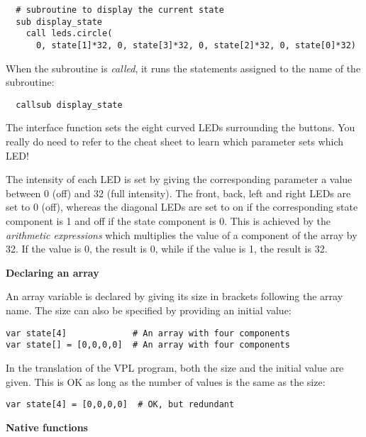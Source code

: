 \begin{footnotesize}
\begin{verbatim}
  # subroutine to display the current state
  sub display_state
    call leds.circle(
      0, state[1]*32, 0, state[3]*32, 0, state[2]*32, 0, state[0]*32)
\end{verbatim}
\end{footnotesize}

When the subroutine is \emph{called}, it runs the statements assigned to
the name of the subroutine:
\vspace{-1ex}
\begin{footnotesize}
\begin{verbatim}
  callsub display_state
\end{verbatim}
\end{footnotesize}
\vspace{-1ex}
The interface function  sets the eight curved LEDs
surrounding the buttons. You really do need to refer to the cheat sheet
to learn which parameter sets which LED!

The intensity of each LED is set by giving the corresponding parameter a
value between 0 (off) and 32 (full intensity). The front, back,
left and right LEDs are set to 0 (off), whereas the diagonal LEDs are
set to on if the corresponding state component is 1 and off if the state
component is 0. This is achieved by the \emph{arithmetic expressions}
 which multiplies the value of a component of the array
by 32. If the value is 0, the result is 0, while if the value is 1, the
result is 32.

\textbf{\large Declaring an array}

An array variable is declared by giving its size in brackets following
the array name. The size can also be specified by providing an initial
value:

\begin{verbatim}
var state[4]             # An array with four components
var state[] = [0,0,0,0]  # An array with four components
\end{verbatim}

In the translation of the VPL program, both the size and the initial
value are given. This is OK as long as the number of values is the same
as the size:

\begin{verbatim}
var state[4] = [0,0,0,0]  # OK, but redundant
\end{verbatim}

\textbf{\large Native functions}

